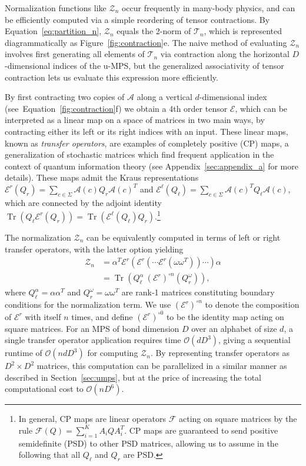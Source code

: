 \documentclass[twoside]{article}
\newcommand{\eqnref}[1]{Equation~\ref{#1}}
\DeclareMathOperator{\Tr}{Tr}
\newcommand{\bigO}{\mc{O}}
\newcommand{\Z}{\mc{Z}}
\newcommand{\E}{\mc{E}}
\newcommand{\EL}{\mc{E}^{\scriptstyle \ell}}
\newcommand{\ER}{\mc{E}^{\scriptstyle r}}
\newcommand{\QL}{Q_{\ell}}
\newcommand{\QR}{Q_{r}}
\newcommand{\alphamat}{\alpha\alpha^T}
\newcommand{\omegamat}{\omega\omega^T}
\newcommand{\mc}[1]{\mathcal{#1}}
\begin{document}
Normalization functions like $\Z_n$ occur frequently in many-body physics, and can be efficiently computed via a simple reordering of tensor contractions. By \eqnref{eq:partition_n}, $\Z_n$ equals the 2-norm of $\mc{T}_n$, which is represented diagrammatically as Figure~\ref{fig:contraction}e. The naive method of evaluating $\Z_n$ involves first generating all elements of $\mc{T}_n$ via contraction along the horizontal $D$-dimensional indices of the u-MPS, but the generalized associativity of tensor contraction lets us evaluate this expression more efficiently.

By first contracting two copies of $\mc{A}$ along a vertical $d$-dimensional index (see~\eqnref{fig:contraction}f) we obtain a 4th order tensor $\E$, which can be interpreted as a linear map on a space of matrices in two main ways, by contracting either its left or its right indices with an input. These linear maps, known as \emph{transfer operators}, are examples of completely positive (CP) maps, a generalization of stochastic matrices which find frequent application in the context of quantum information theory (see Appendix~\ref{sec:appendix_a} for more details). These maps admit the Kraus representations $\ER(\QR) = \sum_{c\in\Sigma} \mc{A}(c) \QR \mc{A}(c)^T$ and $\EL(\QL) = \sum_{c\in\Sigma} \mc{A}(c)^T \QL \mc{A}(c)$, which are connected by the adjoint identity $\Tr(\QL \ER(\QR)) = \Tr(\EL(\QL) \QR)$.\footnote{In general, CP maps are linear operators $\mc{F}$ acting on square matrices by the rule $\mc{F}(Q) = \sum_{i=1}^K A_i Q A_i^T$. CP maps are guaranteed to send positive semidefinite (PSD) to other PSD matrices, allowing us to assume in the following that all $\QL$ and $\QR$ are PSD.}

The normalization $\Z_n$ can be equivalently computed in terms of left or right transfer operators, with the latter option yielding
%
\begin{align}
\label{eq:normalization}
\Z_n &= \alpha^T \ER(\ER(\cdots\ER(\omegamat))\cdots) \alpha \nonumber\\
         &= \Tr\left( \QL^\alpha\ (\ER)^{\circ n}(\QR^\omega) \right),
\end{align}
%
where $\QL^\alpha = \alphamat$ and $\QR^\omega = \omegamat$ are rank-1 matrices constituting boundary conditions for the normalization term. We use $(\ER)^{\circ n}$ to denote the composition of $\ER$ with itself $n$ times, and define $(\ER)^{\circ 0}$ to be the identity map acting on square matrices. For an MPS of bond dimension $D$ over an alphabet of size $d$, a single transfer operator application requires time $\bigO(dD^3)$, giving a sequential runtime of $\bigO(ndD^3)$ for computing $\Z_n$. By representing transfer operators as $D^2 \times D^2$ matrices, this computation can be parallelized in a similar manner as described in Section~\ref{sec:umps}, but at the price of increasing the total computational cost to $\bigO(nD^6)$.
\end{document}
